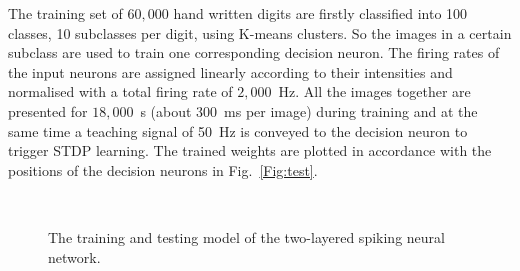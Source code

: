 The training set of $60,000$ hand written digits are firstly classified into 100 classes, 10 subclasses per digit, using K-means clusters.
So the images in a certain subclass are used to train one corresponding decision neuron.
The firing rates of the input neurons are assigned linearly according to their intensities and normalised with a total firing rate of $2,000$~Hz.
All the images together are presented for $18,000$~s (about 300~ms per image) during training and at the same time a teaching signal of 50~Hz is conveyed to the decision neuron to trigger STDP learning.
The trained weights are plotted in accordance with the positions of the decision neurons in Fig.~\ref{Fig:test}.
\begin{figure}[thb!]
	\centering
	 \\

	\centering
	
		
	\caption{The training and testing model of the two-layered spiking neural network.}
	\label{fig:model}
\end{figure} 



